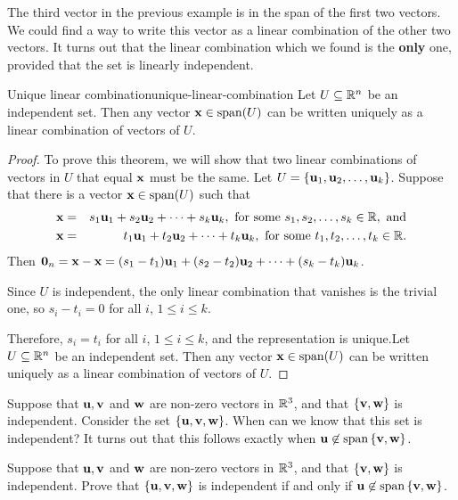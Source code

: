 The third vector in the previous example is in the span of the first two vectors. We could find a way to write this vector as a linear combination of the other two vectors. It turns out that the linear combination which we found is the \textbf{only} one, provided that the set is linearly independent. 

\begin{theorem}{Unique linear combination}{unique-linear-combination}
Let $U \subseteq\mathbb{R}^n$ be an independent set.
Then any vector $\vect{x}\in\sspan(U)$ can be written uniquely as a linear combination of vectors of $U$.
\end{theorem}

\begin{proof}
To prove this theorem, we will show that two linear combinations of vectors in $U$ that equal $\mbox{\bf x}$ must be the same. Let $U =\left\{\mbox{\bf u}_1, \mbox{\bf u}_2, \ldots, \mbox{\bf u}_k\right\}$.
Suppose that there is a vector $\vect{x}\in \sspan(U)$ such that
\begin{eqnarray*}
\mbox{\bf x} & = & s_1\mbox{\bf u}_1 + s_2\mbox{\bf u}_2 + \cdots + s_k\mbox{\bf u}_k,
\mbox{ for some } s_1, s_2, \ldots, s_k\in\mathbb{R}, \mbox{ and} \\
\mbox{\bf x} & = & t_1\mbox{\bf u}_1 + t_2\mbox{\bf u}_2 + \cdots + t_k\mbox{\bf u}_k,
\mbox{ for some } t_1, t_2, \ldots, t_k\in\mathbb{R}.
\end{eqnarray*}
Then 
$\mbox{\bf 0}_n=\mbox{\bf x}-\mbox{\bf x} = (s_1-t_1)\mbox{\bf u}_1 + (s_2-t_2)\mbox{\bf u}_2 + \cdots +
(s_k-t_k)\mbox{\bf u}_k$.

Since $U$ is independent, the only linear combination that vanishes
is the trivial one, so $s_i-t_i=0$ for all $i$, $1\leq i\leq k$.

Therefore, $s_i=t_i$ for all $i$, $1\leq i\leq k$, and the
representation is unique.Let $U \subseteq\mathbb{R}^n$ be an independent set.
Then any vector $\vect{x}\in\sspan(U)$ can be written uniquely as a linear combination of vectors of $U$.
\end{proof}

Suppose that $\mbox{\bf u},\mbox{\bf v}$ and $\mbox{\bf w}$ are non-zero vectors in $\mathbb{R}^3$,
and that $\left\{\mbox{\bf v},\mbox{\bf w}\right\}$ is independent. Consider the set $\left\{\mbox{\bf u},\mbox{\bf v},\mbox{\bf w}\right\}$. When can we know that this set is independent? It turns out that this follows exactly when $\vect{u}\not\in\sspan\set{\vect{v},\vect{w}}$.

\begin{example}{}{}
Suppose that $\mbox{\bf u},\mbox{\bf v}$ and $\mbox{\bf w}$ are non-zero vectors in $\mathbb{R}^3$,
and that $\left\{\mbox{\bf v},\mbox{\bf w}\right\}$ is independent.
Prove that $\left\{\mbox{\bf u},\mbox{\bf v},\mbox{\bf w}\right\}$ is independent if and only if 
$\vect{u}\not\in\sspan\set{\vect{v},\vect{w}}$.
\end{example}

